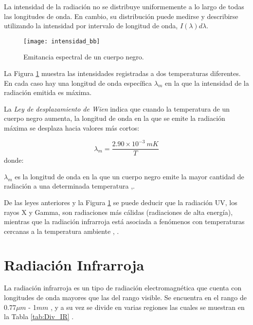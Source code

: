    La intensidad de la radiación no se distribuye uniformemente a lo largo de todas las longitudes de onda. En cambio, su distribución puede medirse y describirse utilizando la intensidad por intervalo de longitud de onda, $I(\lambda)d\lambda$.
            \begin{figure}[hbtp]
                \centering
                \texttt{[image: intensidad\_bb]}
                \caption{Emitancia espectral de un cuerpo negro.}
                \label{fig:intensidad_bb}
            \end{figure}    
    \newpage
    La Figura \ref{fig:intensidad_bb} muestra las intensidades registradas a dos temperaturas diferentes. En cada caso hay una longitud de onda específica $\lambda_{m}$ en la que la intensidad de la radiación emitida es máxima.
    
    La \textit{Ley de desplazamiento de Wien} indica que cuando la temperatura de un cuerpo negro aumenta, la longitud de onda en la que se emite la radiación máxima se desplaza hacia valores más cortos:
    
    \begin{equation}
        \lambda_{m} = \frac{2.90\times10^{-3}\ mK}{T}
        \label{eq:Wien}
    \end{equation}   
    donde:
    
    $\lambda_{m}$ es la longitud de onda en la que un cuerpo negro emite la mayor cantidad de radiación a una determinada temperatura \cite{Sears},\cite{FUV3}.
    
    De las leyes anteriores y la Figura \ref{fig:intensidad_bb} se puede deducir que la radiación UV, los rayos X y Gamma, son radiaciones más cálidas (radiaciones de alta energía), mientras que la radiación infrarroja está asociada a fenómenos con temperaturas cercanas a la temperatura ambiente \cite{Chang}, \cite{BlancoMDA}.     
    
    \section{Radiación Infrarroja} 
    La radiación infrarroja es un tipo de radiación electromagnética que cuenta con longitudes de onda mayores que las del rango visible. Se encuentra en el rango de 0.77$\mu m$ - 1$mm$ \cite{BlancoMDA}, y a su vez se divide en varias regiones las cuales se muestran en la Tabla \ref{tab:Div_IR} \cite{Rogalski}.
    

